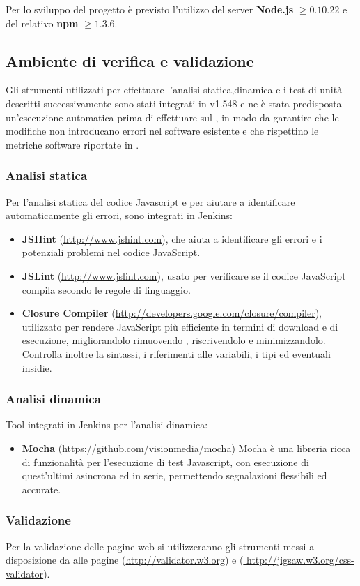 		Per lo sviluppo del progetto è previsto l'utilizzo del server \textbf{Node.js} $\geq 0.10.22$ e del relativo  \textbf{npm} $\geq 1.3.6$.

	\subsection{Ambiente di verifica e validazione}
	Gli strumenti utilizzati per effettuare l'analisi statica,dinamica e i test di unità descritti successivamente sono stati
	integrati in  v1.548 e ne è stata predisposta un'esecuzione automatica prima di effettuare 
	sul , in modo da garantire che le modifiche non introducano errori nel software esistente e che rispettino
	le metriche software riportate in \PianoDiQualifica{}.

		\subsubsection{Analisi statica}
		
		Per l'analisi statica del codice Javascript e per aiutare a identificare automaticamente gli errori, sono integrati in
		Jenkins:
		\begin{itemize}
		\item \textbf{JSHint} (\url{http://www.jshint.com}), che aiuta a identificare gli errori e i potenziali
		problemi nel
		codice JavaScript.
		\item \textbf{JSLint} (\url{http://www.jslint.com}),  usato per verificare se il codice JavaScript compila
		secondo le regole di linguaggio.
		\item \textbf{Closure Compiler} (\url{http://developers.google.com/closure/compiler}),  utilizzato per
		rendere JavaScript più efficiente in termini di download e di esecuzione, migliorandolo rimuovendo  , riscrivendolo e minimizzandolo. Controlla inoltre la sintassi, i riferimenti alle variabili, i tipi ed eventuali
		insidie.
		\end{itemize}
		
		\subsubsection{Analisi dinamica} 
		Tool integrati in Jenkins per l'analisi dinamica: 
		\begin{itemize}
		\item \textbf{Mocha} (\url{https://github.com/visionmedia/mocha}) Mocha è una libreria ricca di funzionalità per l'esecuzione
		di test Javascript, con esecuzione di quest'ultimi asincrona ed in serie, permettendo segnalazioni flessibili ed accurate.
		\end{itemize}
	
			
		\subsubsection{Validazione}
		Per la validazione delle pagine web si utilizzeranno gli strumenti messi a disposizione da  alle pagine 
		 (\url{http://validator.w3.org}) e (\url{ http://jigsaw.w3.org/css-validator}).			
		
